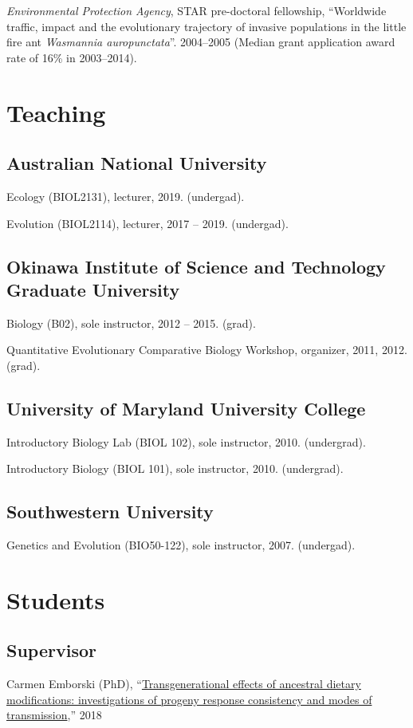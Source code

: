 \documentclass[11pt]{article}
\begin{document}
\ind \textit{Environmental Protection Agency}, STAR pre-doctoral fellowship, ``Worldwide traffic, impact and the evolutionary trajectory of invasive
populations in the little fire ant \textit{Wasmannia auropunctata}''.  2004--2005 (Median grant application award rate of 16\% in 2003--2014).



\section{Teaching}

\subsection{Australian National University}
\ind Ecology (BIOL2131), lecturer, 2019. (undergad).

\ind Evolution (BIOL2114), lecturer, 2017 -- 2019. (undergad).

\subsection{Okinawa Institute of Science and Technology Graduate University}
\ind Biology (B02), sole instructor, 2012 -- 2015. (grad).

\ind Quantitative Evolutionary Comparative Biology Workshop, organizer, 2011, 2012. (grad).

\subsection{University of Maryland University College}
\ind Introductory Biology Lab (BIOL 102), sole instructor, 2010. (undergrad).

\ind Introductory Biology (BIOL 101), sole instructor, 2010. (undergrad).

\subsection{Southwestern University}
\ind Genetics and Evolution (BIO50-122), sole instructor, 2007. (undergad).


\section{Students}

\subsection{Supervisor}
\ind Carmen Emborski (PhD), ``\href{https://ttu-ir.tdl.org/bitstream/handle/2346/74394/EMBORSKI-DISSERTATION-2018.pdf}{Transgenerational effects of ancestral dietary modifications:
investigations of progeny response consistency and modes of transmission},'' 2018
\end{document}
